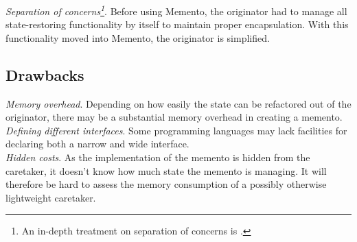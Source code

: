 \documentclass[11pt, a4paper, twoside]{article}
\begin{document}
	\noindent\emph{Separation of concerns\footnote{An in-depth treatment on separation of concerns is \cite{Huersch95}.}}. Before using Memento, the originator had to manage all state-restoring functionality by itself to maintain proper encapsulation. With this functionality moved into Memento, the originator is simplified.
	
	\subsection{Drawbacks}
	\emph{Memory overhead}. Depending on how easily the state can be refactored out of the originator, there may be a substantial memory overhead in creating a memento. \\
	
	\noindent\emph{Defining different interfaces}. Some programming languages may lack facilities for declaring both a narrow and wide interface. \\
	
	\noindent\emph{Hidden costs}. As the implementation of the memento is hidden from the caretaker, it doesn't know how much state the memento is managing. It will therefore be hard to assess the memory consumption of a possibly otherwise lightweight caretaker.
	
	
	
\end{document}
